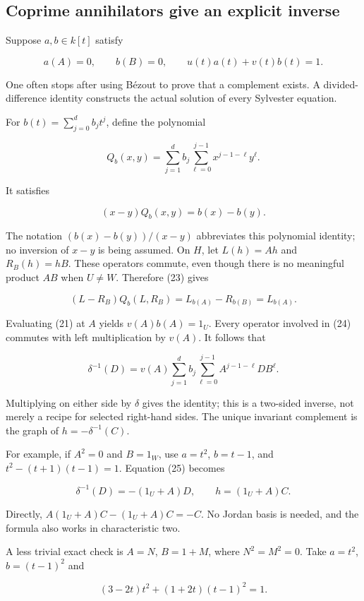 \documentclass[
  11pt,
]{article}
\begin{document}
\subsection{Coprime annihilators give an explicit
inverse}\label{coprime-annihilators-give-an-explicit-inverse}

Suppose \(a,b\in k[t]\) satisfy

\[a(A)=0,\qquad b(B)=0,\qquad u(t)a(t)+v(t)b(t)=1.\tag{21}\]

One often stops after using Bézout to prove that a complement exists. A
divided-difference identity constructs the actual solution of every
Sylvester equation.

For \(b(t)=\sum_{j=0}^d b_jt^j\), define the polynomial

\[Q_b(x,y)=\sum_{j=1}^d b_j\sum_{\ell=0}^{j-1}x^{j-1-\ell}y^\ell.
\tag{22}\]

It satisfies

\[(x-y)Q_b(x,y)=b(x)-b(y).\tag{23}\]

The notation \((b(x)-b(y))/(x-y)\) abbreviates this polynomial identity;
no inversion of \(x-y\) is being assumed. On \(H\), let \(L(h)=Ah\) and
\(R_B(h)=hB\). These operators commute, even though there is no
meaningful product \(AB\) when \(U\ne W\). Therefore (23) gives

\[(L-R_B)Q_b(L,R_B)=L_{b(A)}-R_{b(B)}=L_{b(A)}.\tag{24}\]

Evaluating (21) at \(A\) yields \(v(A)b(A)=1_U\). Every operator
involved in (24) commutes with left multiplication by \(v(A)\). It
follows that

\[\boxed{\ \delta^{-1}(D)=v(A)
\sum_{j=1}^d b_j\sum_{\ell=0}^{j-1}A^{j-1-\ell}DB^\ell.\ }\tag{25}\]

Multiplying on either side by \(\delta\) gives the identity; this is a
two-sided inverse, not merely a recipe for selected right-hand sides.
The unique invariant complement is the graph of \(h=-\delta^{-1}(C)\).

For example, if \(A^2=0\) and \(B=1_W\), use \(a=t^2\), \(b=t-1\), and
\(t^2-(t+1)(t-1)=1\). Equation (25) becomes

\[\delta^{-1}(D)=-(1_U+A)D,\qquad
h=(1_U+A)C.\]

Directly, \(A(1_U+A)C-(1_U+A)C=-C\). No Jordan basis is needed, and the
formula also works in characteristic two.

A less trivial exact check is \(A=N\), \(B=1+M\), where \(N^2=M^2=0\).
Take \(a=t^2\), \(b=(t-1)^2\) and

\[(3-2t)t^2+(1+2t)(t-1)^2=1.\]
\end{document}
